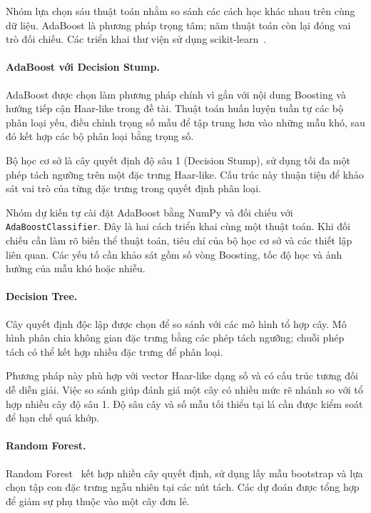\documentclass[12pt,a4paper,oneside]{report}
\begin{document}
Nhóm lựa chọn sáu thuật toán nhằm so sánh các cách
học khác nhau trên cùng dữ liệu.
AdaBoost là phương pháp trọng tâm;
năm thuật toán còn lại đóng vai trò đối chiếu.
Các triển khai thư viện sử dụng
scikit-learn~\cite{pedregosa2011}.

\paragraph{AdaBoost với Decision Stump.}

AdaBoost được chọn làm phương pháp chính vì
gắn với nội dung Boosting và hướng tiếp cận
Haar-like trong đề tài.
Thuật toán huấn luyện tuần tự các bộ phân loại yếu,
điều chỉnh trọng số mẫu để tập trung hơn vào
những mẫu khó, sau đó kết hợp các bộ phân loại
bằng trọng số.

Bộ học cơ sở là cây quyết định độ sâu 1
(Decision Stump), sử dụng tối đa một phép tách
ngưỡng trên một đặc trưng Haar-like.
Cấu trúc này thuận tiện để khảo sát vai trò
của từng đặc trưng trong quyết định phân loại.

Nhóm dự kiến tự cài đặt AdaBoost bằng NumPy
và đối chiếu với \texttt{AdaBoostClassifier}.
Đây là hai cách triển khai cùng một thuật toán.
Khi đối chiếu cần làm rõ biến thể thuật toán,
tiêu chí của bộ học cơ sở và các thiết lập liên quan.
Các yếu tố cần khảo sát gồm số vòng Boosting,
tốc độ học và ảnh hưởng của mẫu khó hoặc nhiễu.

\paragraph{Decision Tree.}

Cây quyết định độc lập được chọn để so sánh
với các mô hình tổ hợp cây.
Mô hình phân chia không gian đặc trưng bằng
các phép tách ngưỡng; chuỗi phép tách có thể
kết hợp nhiều đặc trưng để phân loại.

Phương pháp này phù hợp với vector Haar-like
dạng số và có cấu trúc tương đối dễ diễn giải.
Việc so sánh giúp đánh giá một cây có nhiều mức
rẽ nhánh so với tổ hợp nhiều cây độ sâu 1.
Độ sâu cây và số mẫu tối thiểu tại lá
cần được kiểm soát để hạn chế quá khớp.

\paragraph{Random Forest.}

Random Forest~\cite{breiman2001} kết hợp nhiều
cây quyết định, sử dụng lấy mẫu bootstrap
và lựa chọn tập con đặc trưng ngẫu nhiên
tại các nút tách.
Các dự đoán được tổng hợp để giảm sự phụ thuộc
vào một cây đơn lẻ.
\end{document}
